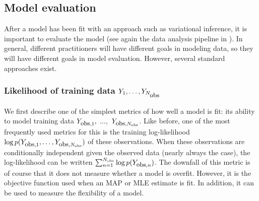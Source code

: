 
\subsection{Model evaluation}
After a model has been fit with an approach such as variational
inference, it is important to evaluate the model (see again the data
analysis pipeline in ).  In general,
different practitioners will have different goals in modeling data, so
they will have different goals in model evaluation.  However, several
standard approaches exist.

\subsubsection{Likelihood of training data $Y_1, \ldots,
  Y_{N_{\mbox{\small obs}}}$}
We first describe one of the simplest metrics of how well a model is fit:
its ability to model training data $Y_{\mbox{\small obs},1},$
$\ldots,$ $Y_{\mbox{\small obs},N_{\mbox{\tiny obs}}}$.  Like before,
one of the most frequently used metrics for this is the training
log-likelihood $\log p(Y_{\mbox{\small obs},1}, \ldots,
Y_{\mbox{\small obs},N_{\mbox{\tiny obs}}})$ of these
observations. When these observations are conditionally independent
given the observed data (nearly always the case), the log-likelihood
can be written $\sum_{n=1}^{N_{\mbox{\tiny obs}}} \log
p(Y_{\mbox{\small obs},n})$.  The downfall of this metric is of course
that it does not measure whether a model is overfit.  However, it is
the objective function used when an MAP or MLE estimate is
fit.  In addition, it can be used to measure the flexibility of a model.


